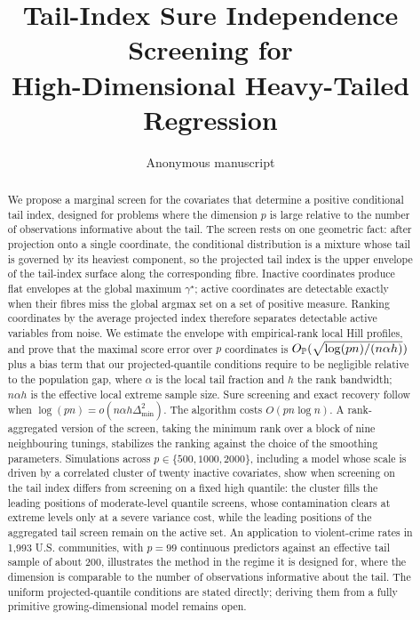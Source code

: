 \documentclass[11pt]{article}
\title{Tail-Index Sure Independence Screening for\\High-Dimensional Heavy-Tailed Regression}
\author{Anonymous manuscript}\date{}
\theoremstyle{remark}\newtheorem{remark}[theorem]{Remark}
\newcommand{\gmax}{\gamma^\star}
\begin{document}
\maketitle
\begin{abstract}
We propose a marginal screen for the covariates that determine a positive
conditional tail index, designed for problems where the dimension $p$ is large
relative to the number of observations informative about the tail. The screen
rests on one geometric fact: after projection onto a single coordinate, the
conditional distribution is a mixture whose tail is governed by its heaviest
component, so the projected tail index is the upper envelope of the tail-index
surface along the corresponding fibre. Inactive coordinates produce flat
envelopes at the global maximum $\gmax$; active coordinates are detectable
exactly when their fibres miss the global argmax set on a set of positive
measure. Ranking coordinates by the average projected index therefore
separates detectable active variables from noise. We estimate the envelope
with empirical-rank local Hill profiles, and prove that the maximal score
error over $p$ coordinates is
$O_{\mathbb P}(\sqrt{\log(pn)/(n\alpha h)})$ plus a bias term that our
projected-quantile conditions require to be negligible relative to the
population gap, where $\alpha$ is the local tail fraction and $h$ the rank
bandwidth; $n\alpha h$ is the effective local extreme sample size. Sure
screening and exact recovery follow when
$\log(pn)=o(n\alpha h\Delta_{\min}^2)$. The algorithm costs $O(pn\log n)$.
A rank-aggregated version of the screen, taking the minimum rank over a
block of nine neighbouring tunings, stabilizes the ranking against the
choice of the smoothing parameters. Simulations across
$p\in\{500,1000,2000\}$, including a model whose scale is driven by a
correlated cluster of twenty inactive covariates, show when screening on
the tail index differs from screening on a fixed high quantile: the
cluster fills the leading positions of moderate-level quantile screens,
whose contamination clears at extreme levels only at a severe variance
cost, while the leading positions of the aggregated tail screen remain
on the active set. An application to violent-crime rates in 1{,}993
U.S. communities, with $p=99$ continuous predictors against an
effective tail sample of about $200$, illustrates the method in the
regime it is designed for, where the dimension is comparable to the
number of observations informative about the tail. The uniform
projected-quantile conditions are stated directly; deriving them from a fully
primitive growing-dimensional model remains open.
\end{abstract}




\FloatBarrier

\FloatBarrier

\appendix


\end{document}
